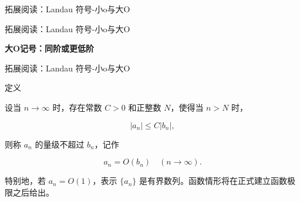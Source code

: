 \documentclass[aspectratio=169,10pt,fontset=fandol]{ctexbeamer}
\newenvironment{custom}[1]{\par\noindent\textbf{#1}\quad}{\par\vspace{0.8em}}
\begin{document}
\begin{frame}[t,fragile]{拓展阅读：Landau 符号-小o与大O}
\normalsize
{}
\end{frame}
\begin{frame}[t,fragile]{拓展阅读：Landau 符号-小o与大O}
\normalsize
{\normalsize




\textbf{大O记号：同阶或更低阶}




}
\end{frame}
\begin{frame}[t,fragile]{拓展阅读：Landau 符号-小o与大O}
\normalsize
\begin{block}{定义}
{\normalsize


设当 \(n\to\infty\) 时，存在常数 \(C>0\) 和正整数 \(N\)，使得当 \(n>N\) 时，

\[

|a_n| \leq C |b_n|,

\]

则称 \(a_n\) 的量级不超过 \(b_n\)，记作

\[

a_n = O(b_n) \quad (n \to \infty).

\]



特别地，若 \(a_n=O(1)\)，表示 \(\{a_n\}\) 是有界数列。函数情形将在正式建立函数极限之后给出。


}
\end{block}
\end{frame}
\end{document}
